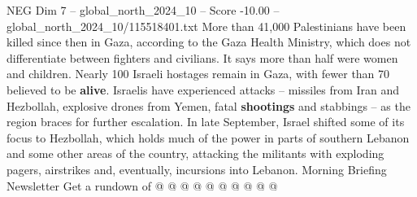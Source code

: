\begin{textsample}{NEG Dim 7 – global\_north\_2024\_10 – Score -10.00 – global\_north\_2024\_10/115518401.txt}
More than 41,000 Palestinians have been killed since then in Gaza, according to the Gaza Health Ministry, which does not differentiate between fighters and civilians.
It says more than half were women and children.
Nearly 100 Israeli hostages remain in Gaza, with fewer than 70 believed to be \textbf{alive}.
Israelis have experienced attacks -- missiles from Iran and Hezbollah, explosive drones from Yemen, fatal \textbf{shootings} and stabbings -- as the region braces for further escalation.
In late September, Israel shifted some of its focus to Hezbollah, which holds much of the power in parts of southern Lebanon and some other areas of the country, attacking the militants with exploding pagers, airstrikes and, eventually, incursions into Lebanon.
Morning Briefing Newsletter Get a rundown of @ @ @ @ @ @ @ @ @ @

\end{textsample}
